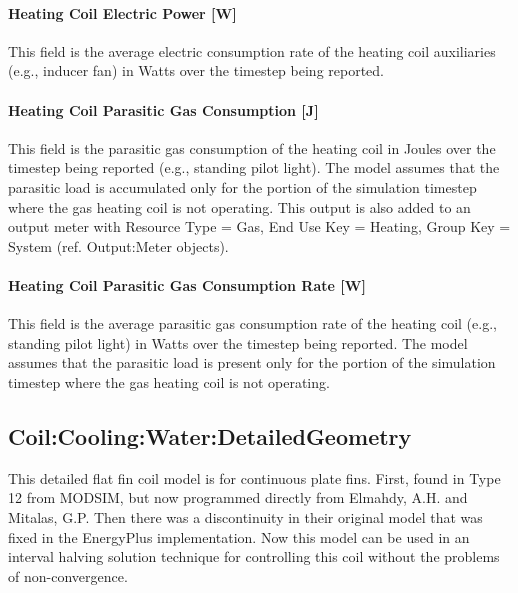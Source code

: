 \paragraph{Heating Coil Electric Power {[}W{]}}\label{heating-coil-electric-power-w-4}

This field is the average electric consumption rate of the heating coil auxiliaries (e.g., inducer fan) in Watts over the timestep being reported.

\paragraph{Heating Coil Parasitic Gas Consumption {[}J{]}}\label{heating-coil-parasitic-gas-consumption-j}

This field is the parasitic gas consumption of the heating coil in Joules over the timestep being reported (e.g., standing pilot light). The model assumes that the parasitic load is accumulated only for the portion of the simulation timestep where the gas heating coil is not operating. This output is also added to an output meter with Resource Type = Gas, End Use Key = Heating, Group Key = System (ref. Output:Meter objects).

\paragraph{Heating Coil Parasitic Gas Consumption Rate {[}W{]}}\label{heating-coil-parasitic-gas-consumption-rate-w}

This field is the average parasitic gas consumption rate of the heating coil (e.g., standing pilot light) in Watts over the timestep being reported. The model assumes that the parasitic load is present only for the portion of the simulation timestep where the gas heating coil is not operating.

\subsection{Coil:Cooling:Water:DetailedGeometry}\label{coilcoolingwaterdetailedgeometry}

This detailed flat fin coil model is for continuous plate fins. First, found in Type 12 from MODSIM, but now programmed directly from Elmahdy, A.H. and Mitalas, G.P. Then there was a discontinuity in their original model that was fixed in the EnergyPlus implementation. Now this model can be used in an interval halving solution technique for controlling this coil without the problems of non-convergence.

